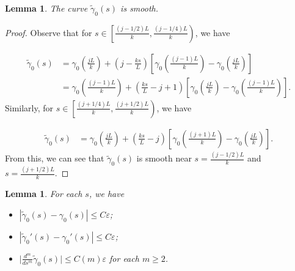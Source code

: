 \documentclass[a4paper, reqno]{amsart}
\newtheorem{lemma}[theorem]{Lemma}
\theoremstyle{definition}
\theoremstyle{remark}
\numberwithin{equation}{section}
\numberwithin{equation}{section}
\numberwithin{equation}{section}
\begin{document}
\begin{lemma}{\label{smoothness}}
	The curve $\tilde{\gamma}_0(s)$ is smooth.
\end{lemma}

\begin{proof}
Observe that for $s\in \left[ \frac{(j - 1/2)L}{k}, \frac{(j - 1/4)L}{k}\right)$, we have

\begin{align*}
	\tilde{\gamma}_0(s) &= 	\gamma_0\left(\frac{jL}{k}\right) + \left(j -\frac{ks}{L} \right)\left[ \gamma_0\left(\frac{(j-1)L}{k}\right) - \gamma_0\left(\frac{jL}{k}\right)\right]\\
	&= \gamma_0\left(\frac{(j-1)L}{k}\right) +  \left(\frac{ks}{L} - j + 1 \right)\left[ \gamma_0\left(\frac{jL}{k}\right) - \gamma_0\left(\frac{(j-1)L}{k}\right)\right].
\end{align*}
Similarly, for $s\in \left[ \frac{(j + 1/4)L}{k}, \frac{(j + 1/2)L}{k}\right)$, we have

\begin{align*}
	\tilde{\gamma}_0(s) &= \gamma_0\left(\frac{jL}{k}\right) +  \left(\frac{ks}{L} - j \right)\left[ \gamma_0\left(\frac{(j+1)L}{k}\right) - \gamma_0\left(\frac{jL}{k}\right)\right].
\end{align*}
From this, we can see that $\tilde{\gamma}_0(s)$ is smooth near $s = \frac{(j - 1/2)L}{k}$ and $s = \frac{(j + 1/2)L}{k}$.

\end{proof}


\begin{lemma}{\label{closeness}}
	For each $s$, we have
	\begin{itemize}
	\item[(i)]	$| \tilde{\gamma}_0(s)-\gamma_0(s)|\leq C\varepsilon$;
	\item[(ii)] $| \tilde{\gamma}_0'(s)-\gamma_0'(s)|\leq C\varepsilon$;
	\item[(iii)] $\Big|\frac{d^m}{ds^m}\tilde{\gamma}_0(s)\Big|\leq C(m)\varepsilon$ for each $m\geq 2$.
	\end{itemize}
\end{lemma}
\end{document}

